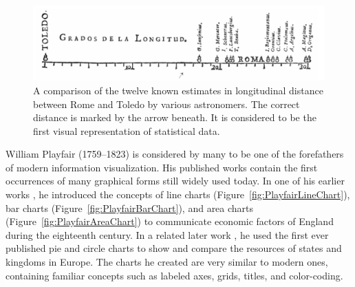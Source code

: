 



\begin{figure}[tp]
\centering
\includegraphics[keepaspectratio,width=\linewidth,height=\thirdh]
{images/rome-toledo-longitude.png}
\caption[Chart of Longitudinal Distance Determinations Between Toledo and Rome From 1644]{%
A comparison of the twelve known estimates in longitudinal
distance between Rome and Toledo by various astronomers. The correct
distance is marked by the arrow beneath. It is considered to be the
first visual representation of statistical data.
}
\label{fig:RomeToledoLongitude}
\end{figure}







William Playfair (1759--1823) is considered by many to be one of the
forefathers of modern information visualization. His published works
contain the first occurrences of many graphical forms still widely
used today. In one of his earlier works
\parencite{CommercialAndPoliticalAtlas}, he introduced the concepts of
line charts (Figure~\ref{fig:PlayfairLineChart}), bar charts
(Figure~\ref{fig:PlayfairBarChart}), and area charts
(Figure~\ref{fig:PlayfairAreaChart}) to communicate economic factors
of England during the eighteenth century. In a related later work
\parencite{StatisticalBreviary}, he used the first ever published pie
and circle charts to show and compare the resources of states and
kingdoms in Europe. The charts he created are very similar to modern
ones, containing familiar concepts such as labeled axes, grids,
titles, and color-coding.



